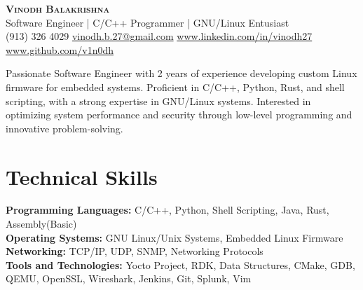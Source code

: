 \documentclass[10pt, letterpaper]{article}
\renewcommand{\maketitle}[6]{
	\begin{center}
	\Large{\bfseries\scshape{#1}} \\
	\vspace*{0.25em}
	\small {#2} \\
	\vspace*{0.25em}
	\faPhoneSquare \hspace{0.1em} {#3} \hspace*{0.5em}
	\faEnvelope \hspace{0.1em} \href{mailto:#4}{#4} \hspace*{0.5em}
		\faLinkedinSquare \hspace{0.1em} \href{https://#5}{#5} \hspace{0.5em}
	\faGithubSquare \hspace{0.1em} \href{https://#6}{#6}
	\end{center}
}
\begin{document}
\maketitle
{Vinodh Balakrishna}
{Software Engineer | C/C++ Programmer | GNU/Linux Entusiast}
{(913) 326 4029}
{vinodh.b.27@gmail.com}
{www.linkedin.com/in/vinodh27}
{www.github.com/v1n0dh}

\thispagestyle{empty}

\noindent
Passionate Software Engineer with 2 years of experience developing custom Linux firmware for embedded systems. Proficient in C/C++, Python, Rust, and shell scripting, with a strong expertise in GNU/Linux systems. Interested in optimizing system performance and security through low-level programming and innovative problem-solving.

\section{Technical Skills}
\textbf{Programming Languages:} C/C++, Python, Shell Scripting, Java, Rust, Assembly(Basic) \\
\textbf{Operating Systems:} GNU Linux/Unix Systems, Embedded Linux Firmware \\
\textbf{Networking:} TCP/IP, UDP, SNMP, Networking Protocols \\
\textbf{Tools and Technologies:} Yocto Project, RDK, Data Structures, CMake, GDB, QEMU, OpenSSL, Wireshark, Jenkins, Git, Splunk, Vim
\end{document}
